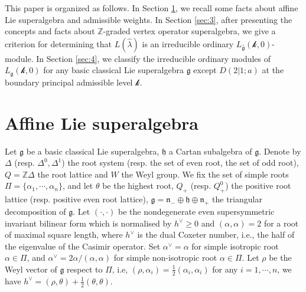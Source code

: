 \documentclass[12pt]{article}
\begin{document}
This paper is organized as follows.
In Section \ref{sec:2},
we recall some facts about affine Lie superalgebra and admissible weights.
In Section \ref{sec:3},
after presenting the concepts and facts about $\mathbb{Z}$-graded vertex operator superalgebra,
we give a criterion for determining that $L(\hat{\lambda})$ is an irreducible ordinary $L_{\widehat{\mathfrak{g}}}(\mathcal{k},0)$-module.
In Section \ref{sec:4},
we classify the irreducible ordinary modules of $L_{\mathfrak{g}}(\mathcal{k},0)$ for any basic classical Lie superalgebra $\mathfrak{g}$ except $D(2|1;a)$ at the boundary principal admissible level $\mathcal{k}$.

\section{Affine Lie superalgebra}
\label{sec:2}
	\def\theequation{2.\arabic{equation}}
	\setcounter{equation}{0}


Let $\mathfrak{g}$ be a basic classical Lie superalgebra, $\mathfrak{h}$ a Cartan subalgebra of $\mathfrak{g}$.
Denote by $\Delta$ (resp. $\Delta^0,\Delta^1$) the root system (resp. the set of even root, the set of odd root),
$Q=\mathbb{Z}\Delta$ the root lattice and $W$ the Weyl group.
We fix the set of simple roots $\Pi=\{\alpha_1,\cdots,\alpha_n\}$, and let $\theta$ be the highest root,
$Q_+$ (resp. $Q_+^0$) the positive root lattice (resp. positive even root lattice),
$\mathfrak{g}=\mathfrak{n}_-\oplus\mathfrak{h}\oplus\mathfrak{n}_+$ the triangular decomposition of $\mathfrak{g}$.
Let $(\cdot,\cdot)$ be the nondegenerate even supersymmetric invariant bilinear form
which is normalised by $h^\vee\geq0$ and $(\alpha,\alpha)=2$ for a root of maximal square length,
where $h^{\vee}$ is the dual Coxeter number, i.e., the half of the eigenvalue of the Casimir operator.
Set $\alpha^{\vee}=\alpha$ for simple isotropic root $\alpha\in\Pi$, and $\alpha^{\vee}=2\alpha/(\alpha,\alpha)$
for simple non-isotropic root $\alpha\in\Pi$.
Let $\rho$ be the Weyl vector of $\mathfrak{g}$ respect to $\Pi$, i.e, $(\rho,\alpha_i)=\frac{1}{2}(\alpha_i,\alpha_i)$ for any $i=1,\cdots,n$,
we have $h^\vee=(\rho,\theta)+\frac{1}{2}(\theta,\theta)$.
\end{document}
